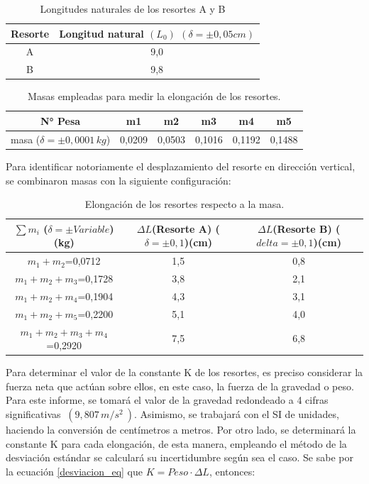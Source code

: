 \documentclass[../main.tex]{subfiles}
\begin{document}
\begin{table}[H]
    \centering
    \begin{tabular}{c | c}
        \hline
        Resorte & Longitud natural $(L_0)$ $(\delta=\pm 0,05 cm)$\\
        \hline
        A	    & 9,0\\
        B	    & 9,8\\
        \hline
    \end{tabular}
    \label{ref:tab1}
    \caption{Longitudes naturales de los resortes A y B}
\end{table}
\begin{table}[H]
    \centering
    \begin{tabular}{c|c|c|c|c|c}
        \hline
        N° Pesa &	m1 & m2 & m3& m4 &m5\\
        \hline
        masa ($\delta = \pm 0,0001 \, kg$) & 0,0209 & 0,0503 & 0,1016 & 0,1192 & 0,1488 \\
        \hline
    \end{tabular}
    \label{ref:tab2}
    \caption{Masas empleadas para medir la elongación de los resortes.}
\end{table}

Para identificar notoriamente el desplazamiento del resorte en dirección vertical, se combinaron masas con la siguiente configuración:

\begin{table}[H]
    \centering
    \begin{tabular}{c | c | c}
        \hline
        $\sum m_i$ ($\delta=\pm Variable$)(kg) &$\Delta L$(Resorte A) ($\delta=\pm 0,1$)(cm) &	$\Delta L$(Resorte B)  ($delta=\pm 0,1$)(cm)\\
        \hline
        $m_1+m_2$=0,0712	        & 1,5	& 0,8 \\
        $m_1+m_2+m_3$=0,1728	    & 3,8	& 2,1\\
        $m_1+m_2+m_4$=0,1904	    & 4,3	& 3,1\\
        $m_1+m_2+m_5$=0,2200	    & 5,1	& 4,0\\
        $m_1+m_2+m_3+m_4$=0,2920	& 7,5	& 6,8\\

        \hline
    \end{tabular}
    \label{ref:tab3}
    \caption{Elongación de los resortes respecto a la masa.}
\end{table}

Para determinar el valor de la constante K de los resortes, es preciso considerar la
fuerza neta que actúan sobre ellos, en este caso, la fuerza de la gravedad o peso.
Para este informe, se tomará el valor de la gravedad redondeado a 4 cifras 
significativas $\ (9,807 \, m/s^2\ )$. Asimismo, se trabajará con el SI
de unidades, haciendo la conversión de centímetros a metros. Por otro lado, se determinará 
la constante K para cada elongación, de esta manera, empleando el método de la 
desviación estándar se calculará su incertidumbre según sea el caso.
Se sabe por la ecuación \ref{desviacion_eq} que $ K = Peso \cdot \Delta L$, entonces:
\end{document}
